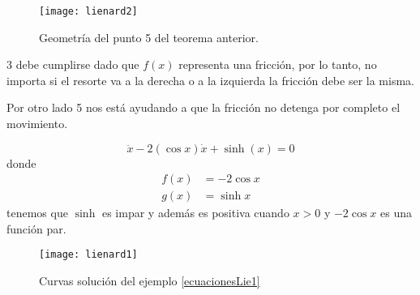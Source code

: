 \begin{figure}[H]
	\centering
	\texttt{[image: lienard2]} 
	\caption{Geometría del punto 5 del teorema anterior.}
\end{figure}
\begin{tcolorbox}[colback=Black!4, colframe=White, arc=2mm]
\begin{nota}
			3 debe cumplirse dado que $f(x)$ representa una fricción, por lo tanto, no importa si el resorte va a la derecha o a la izquierda la fricción debe ser la misma. 

			Por otro lado 5 nos está ayudando a que la fricción no detenga por completo el movimiento.
\end{nota}
\end{tcolorbox}
\begin{ejemplo}  \label{ecuacionesLie1} 
	\begin{equation*}
	  \ddot{x} -2(\cos x)\dot{x} + \sinh (x) = 0 
	\end{equation*}
	donde \begin{align*}
	  f(x) &= -2\cos x \\ 
		g(x)&= \sinh x
	\end{align*}
	tenemos que $\sinh$ es impar y además es positiva cuando  $x>0$ y $-2\cos x$ es una función par.  
	\begin{figure}[H]
		\centering
		\texttt{[image: lienard1]}
		\caption{Curvas solución del ejemplo \ref{ecuacionesLie1} }
	\end{figure}
\end{ejemplo}
